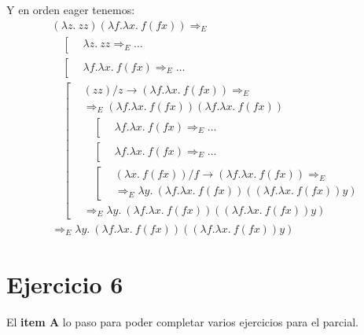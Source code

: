 \documentclass{article}
\begin{document}
Y en orden eager tenemos:
\begin{equation*}
  \begin{aligned}
    &(\lambda z.\ zz)(\lambda f.\lambda x.\ f(fx)) \Rightarrow_E \\
    &\quad\left[
      \begin{aligned}
        &\lambda z.\ zz \Rightarrow_E \dots
      \end{aligned}
    \right. \\ 
    &\quad\left[
      \begin{aligned}
        &\lambda f.\lambda x.\ f(fx) \Rightarrow_E \dots
      \end{aligned}
    \right. \\ 
    &\quad\left[
      \begin{aligned}
        &(zz) / z \to (\lambda f.\lambda x.\ f(fx)) \Rightarrow_E \\
        &\Rightarrow_E (\lambda f.\lambda x.\ f(fx))(\lambda f.\lambda x.\ f(fx)) \\
        &\quad\left[
          \begin{aligned}
            &\lambda f.\lambda x.\ f(fx) \Rightarrow_E \dots
          \end{aligned}
        \right. \\ 
        &\quad\left[
          \begin{aligned}
            &\lambda f.\lambda x.\ f(fx) \Rightarrow_E \dots
          \end{aligned}
        \right. \\ 
        &\quad\left[
          \begin{aligned}
            &(\lambda x.\ f(fx)) / f \to (\lambda f.\lambda x.\ f(fx)) \Rightarrow_E \\ 
            &\Rightarrow_E \lambda y.\ (\lambda f.\lambda x.\ f(fx))((\lambda f.\lambda x.\ f(fx))y) 
          \end{aligned}
        \right. \\ 
        &\Rightarrow_E \lambda y.\ (\lambda f.\lambda x.\ f(fx))((\lambda f.\lambda x.\ f(fx))y)
      \end{aligned}
    \right. \\ 
    &\Rightarrow_E \lambda y.\ (\lambda f.\lambda x.\ f(fx))((\lambda f.\lambda x.\ f(fx))y)
  \end{aligned}
\end{equation*}

\section*{Ejercicio 6}
El \textbf{item A} lo paso para poder completar varios ejercicios para el parcial.
\end{document}
